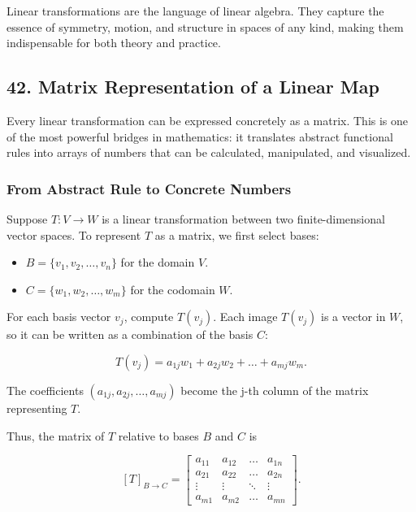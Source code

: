 \documentclass[
  letterpaper,
  DIV=11,
  numbers=noendperiod]{scrreprt}
\providecommand{\tightlist}{%
  \setlength{\itemsep}{0pt}\setlength{\parskip}{0pt}}
\begin{document}
Linear transformations are the language of linear algebra. They capture
the essence of symmetry, motion, and structure in spaces of any kind,
making them indispensable for both theory and practice.

\subsection{42. Matrix Representation of a Linear
Map}\label{matrix-representation-of-a-linear-map}

Every linear transformation can be expressed concretely as a matrix.
This is one of the most powerful bridges in mathematics: it translates
abstract functional rules into arrays of numbers that can be calculated,
manipulated, and visualized.

\subsubsection{From Abstract Rule to Concrete
Numbers}\label{from-abstract-rule-to-concrete-numbers}

Suppose \(T: V \to W\) is a linear transformation between two
finite-dimensional vector spaces. To represent \(T\) as a matrix, we
first select bases:

\begin{itemize}
\tightlist
\item
  \(B = \{v_1, v_2, \dots, v_n\}\) for the domain \(V\).
\item
  \(C = \{w_1, w_2, \dots, w_m\}\) for the codomain \(W\).
\end{itemize}

For each basis vector \(v_j\), compute \(T(v_j)\). Each image \(T(v_j)\)
is a vector in \(W\), so it can be written as a combination of the basis
\(C\):

\[
T(v_j) = a_{1j}w_1 + a_{2j}w_2 + \dots + a_{mj}w_m.
\]

The coefficients \((a_{1j}, a_{2j}, \dots, a_{mj})\) become the j-th
column of the matrix representing \(T\).

Thus, the matrix of \(T\) relative to bases \(B\) and \(C\) is

\[
[T]_{B \to C} = \begin{bmatrix} a_{11} & a_{12} & \dots & a_{1n} \\ a_{21} & a_{22} & \dots & a_{2n} \\ \vdots & \vdots & \ddots & \vdots \\ a_{m1} & a_{m2} & \dots & a_{mn} \end{bmatrix}.
\]
\end{document}
